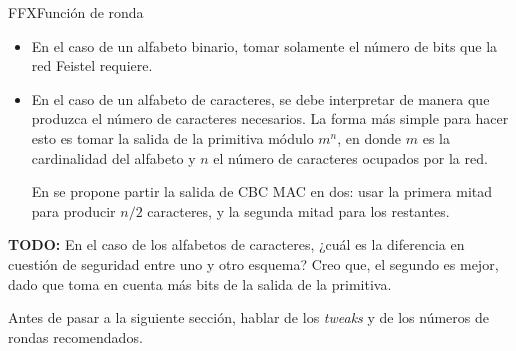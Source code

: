 \begin{frame}{FFX}{Función de ronda}
{\begin{itemize}
      \item En el caso de un alfabeto binario, tomar solamente el número
        de bits que la red Feistel requiere.

      \item En el caso de un alfabeto de caracteres, se debe interpretar de
        manera que produzca el número de caracteres necesarios. La forma más
        simple para hacer esto es tomar la salida de la primitiva módulo
        $ m^n $, en donde $ m $ es la cardinalidad del alfabeto y $ n $ el
        número de caracteres ocupados por la red.

        En \cite{ffx_2} se propone partir la salida de CBC MAC en dos: usar
        la primera mitad para producir $ n/2 $ caracteres, y la segunda
        mitad para los restantes.

    \end{itemize}
  }

  {
    \textbf{TODO:} En el caso de los alfabetos de caracteres, ¿cuál es la
    diferencia en cuestión de seguridad entre uno y otro esquema? Creo que,
    el segundo es mejor, dado que toma en cuenta más bits de la salida de
    la primitiva.

    Antes de pasar a la siguiente sección, hablar de los \textit{tweaks} y
    de los números de rondas recomendados.
  }

\end{frame}
